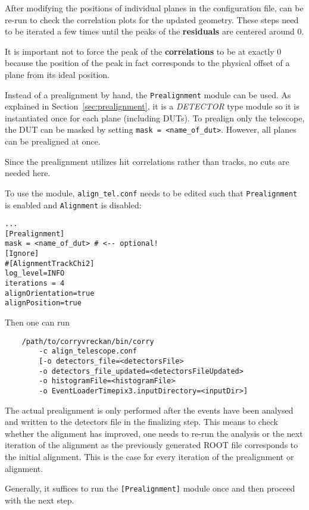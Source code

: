 After modifying the positions of individual planes in the configuration file, \corry can be re-run to check the correlation plots for the updated geometry.
These steps need to be iterated a few times until the peaks of the \textbf{residuals} are centered around 0.
 
It is important not to force the peak of the \textbf{correlations} to be at exactly 0 because the position of the peak in fact corresponds to the physical offset of a plane from its ideal position. 

Instead of a prealignment by hand, the \texttt{Prealignment} module can be used.
As explained in Section~\ref{sec:prealignment}, it is a \textit{DETECTOR} type module so it is instantiated once for each plane (including DUTs).
To prealign only the telescope, the DUT can be masked by setting \texttt{mask = <name\_of\_dut>}.
However, all planes can be prealigned at once.

Since the prealignment utilizes hit correlations rather than tracks, no cuts are needed here.

To use the module, \texttt{align\_tel.conf} needs to be edited such that \texttt{Prealignment} is enabled and \texttt{Alignment} is disabled:
\begin{verbatim}
...
[Prealignment]
mask = <name_of_dut> # <-- optional!
[Ignore]
#[AlignmentTrackChi2]
log_level=INFO
iterations = 4
alignOrientation=true
alignPosition=true
\end{verbatim}

Then one can run
\begin{verbatim}
    /path/to/corryvreckan/bin/corry 
        -c align_telescope.conf
    	[-o detectors_file=<detectorsFile> 
    	-o detectors_file_updated=<detectorsFileUpdated> 
    	-o histogramFile=<histogramFile> 
    	-o EventLoaderTimepix3.inputDirectory=<inputDir>]
\end{verbatim}

The actual prealignment is only performed after the events have been analysed and written to the detectors file in the finalizing step. 
This means to check whether the alignment has improved, one needs to re-run the analysis or the next iteration of the alignment as the previously generated ROOT file corresponds to the initial alignment.
This is the case for every iteration of the prealignment or alignment.

Generally, it suffices to run the \texttt{[Prealignment]} module once and then proceed with the next step.

